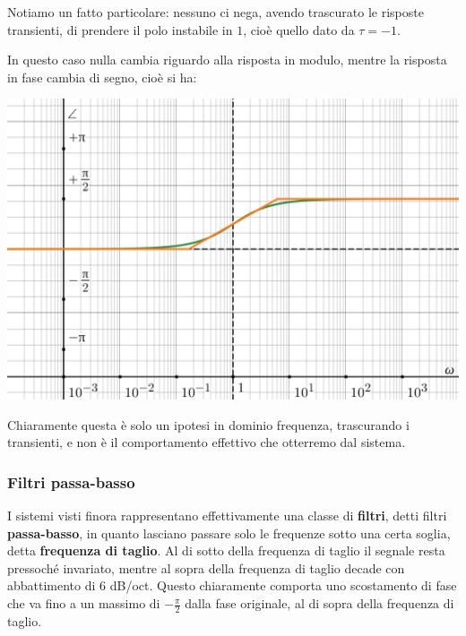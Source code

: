 \documentclass[a4paper,11pt]{article}
\begin{document}
\par\bigskip

Notiamo un fatto particolare: nessuno ci nega, avendo trascurato le risposte transienti, di prendere il polo instabile in $1$, cioè quello dato da $\tau = -1$.

\par\bigskip

\noindent
\begin{minipage}{\textwidth}
In questo caso nulla cambia riguardo alla risposta in modulo, mentre la risposta in fase cambia di segno, cioè si ha:
\begin{center}
	\includegraphics[scale=0.3]{../figures/lowpass_bode/phase_weird.png}
\end{center}
\end{minipage}

\par\bigskip

Chiaramente questa è solo un ipotesi in dominio frequenza, trascurando i transienti, e non è il comportamento effettivo che otterremo dal sistema.

\subsubsection{Filtri passa-basso}
I sistemi visti finora rappresentano effettivamente una classe di \textbf{filtri}, detti filtri \textbf{passa-basso}, in quanto lasciano passare solo le frequenze sotto una certa soglia, detta \textbf{frequenza di taglio}.
Al di sotto della frequenza di taglio il segnale resta pressoché invariato, mentre al sopra della frequenza di taglio decade con abbattimento di 6 dB/oct.
Questo chiaramente comporta uno scostamento di fase che va fino a un massimo di $-\frac{\pi}{2}$ dalla fase originale, al di sopra della frequenza di taglio.
\end{document}
